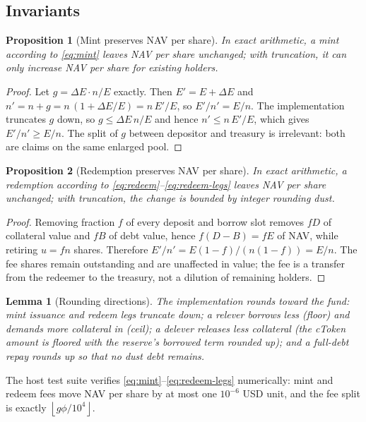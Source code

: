 \documentclass[11pt]{article}
\newtheorem{proposition}{Proposition}
\newtheorem{lemma}{Lemma}
\theoremstyle{remark}
\newcommand{\fl}[1]{\left\lfloor #1 \right\rfloor}
\newcommand{\BPS}{10^{4}}
\newcommand{\NAV}{E}
\begin{document}
\subsection{Invariants}
\label{sec:invariants}

\begin{proposition}[Mint preserves NAV per share]
In exact arithmetic, a mint according to \eqref{eq:mint} leaves NAV per share unchanged; with truncation, it can only increase NAV per share for existing holders.
\end{proposition}
\begin{proof}
Let $g = \Delta\NAV \cdot n/\NAV$ exactly. Then
$\NAV' = \NAV + \Delta\NAV$ and $n' = n + g = n\,(1 + \Delta\NAV/\NAV) = n\,\NAV'/\NAV$,
so $\NAV'/n' = \NAV/n$. The implementation truncates $g$ down, so $g \le \Delta\NAV\,n/\NAV$ and hence $n' \le n\,\NAV'/\NAV$, which gives $\NAV'/n' \ge \NAV/n$. The split of $g$ between depositor and treasury is irrelevant: both are claims on the same enlarged pool.
\end{proof}

\begin{proposition}[Redemption preserves NAV per share]
In exact arithmetic, a redemption according to \eqref{eq:redeem}--\eqref{eq:redeem-legs} leaves NAV per share unchanged; with truncation, the change is bounded by integer rounding dust.
\end{proposition}
\begin{proof}
Removing fraction $f$ of every deposit and borrow slot removes $fD$ of collateral value and $fB$ of debt value, hence $f(D-B) = f\NAV$ of NAV, while retiring $u = fn$ shares. Therefore $\NAV'/n' = \NAV(1-f)/(n(1-f)) = \NAV/n$. The fee shares remain outstanding and are unaffected in value; the fee is a transfer from the redeemer to the treasury, not a dilution of remaining holders.
\end{proof}

\begin{lemma}[Rounding directions]
The implementation rounds toward the fund: mint issuance and redeem legs truncate down; a relever borrows less (floor) and demands more collateral in (ceil); a delever releases less collateral (the cToken amount is floored with the reserve's borrowed term rounded up); and a full-debt repay rounds up so that no dust debt remains.
\end{lemma}

The host test suite verifies \eqref{eq:mint}--\eqref{eq:redeem-legs} numerically: mint and redeem fees move NAV per share by at most one $10^{-6}$ USD unit, and the fee split is exactly $\fl{g\phi/\BPS}$.
\end{document}
